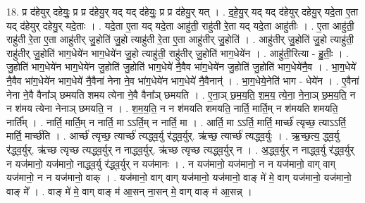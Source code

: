 \documentclass[17pt]{extarticle}
\begin{document}
18. प्र द॑हेयुर् दहेयुः॒ प्र प्र द॑हेयु॒र् यद् यद् द॑हेयुः॒ प्र प्र द॑हेयु॒र् यत् । . द॒हे॒यु॒र् यद् यद् द॑हेयुर् दहेयु॒र् यदे॒ता ए॒ता यद् द॑हेयुर् दहेयु॒र् यदे॒ताः । . यदे॒ता ए॒ता यद् यदे॒ता आहु॑ती॒ राहु॑ती रे॒ता यद् यदे॒ता आहु॑तीः । . ए॒ता आहु॑ती॒ राहु॑ती रे॒ता ए॒ता आहु॑तीर् जु॒होति॑ जु॒हो त्याहु॑ती रे॒ता ए॒ता आहु॑तीर् जु॒होति॑ । . आहु॑तीर् जु॒होति॑ जु॒हो त्याहु॑ती॒ राहु॑तीर् जु॒होति॑ भाग॒धेये॑न भाग॒धेये॑न जु॒हो त्याहु॑ती॒ राहु॑तीर् जु॒होति॑ भाग॒धेये॑न । . आहु॑ती॒रित्या - हु॒तीः॒ । . जु॒होति॑ भाग॒धेये॑न भाग॒धेये॑न जु॒होति॑ जु॒होति॑ भाग॒धेये॑ नै॒वैव भा॑ग॒धेये॑न जु॒होति॑ जु॒होति॑ भाग॒धेये॑नै॒व । . भा॒ग॒धेये॑ नै॒वैव भा॑ग॒धेये॑न भाग॒धेये॑ नै॒वैना॑ नेना ने॒व भा॑ग॒धेये॑न भाग॒धेये॑
नै॒वैनान्॑ । . भा॒ग॒धेये॒नेति॑ भाग - धेये॑न । . ए॒वैना॑ नेना ने॒वै वैना᳚ञ् छमयति शमय त्येना ने॒वै वैना᳚ञ् छमयति । . ए॒ना॒ञ् छ॒म॒य॒ति॒ श॒म॒य॒ त्ये॒ना॒ ने॒ना॒ञ् छ॒म॒य॒ति॒ न न श॑मय त्येना नेनाञ् छमयति॒ न । . श॒म॒य॒ति॒ न न श॑मयति शमयति॒ नार्ति॒ मार्ति॒म् न श॑मयति शमयति॒ नार्ति᳚म् । . नार्ति॒ मार्ति॒म् न नार्ति॒ मा ऽऽर्ति॒म् न नार्ति॒ मा । . आर्ति॒ मा ऽऽर्ति॒ मार्ति॒ मार्च्छ॑ त्यृच्छ॒ त्याऽऽर्ति॒ मार्ति॒ मार्च्छ॑ति । . आर्च्छ॑ त्यृच्छ॒ त्यार्च्छ॑ त्यद्ध्व॒र्यु र॑द्ध्व॒र्युर्. ऋ॑च्छ॒ त्यार्च्छ॑ त्यद्ध्व॒र्युः । . ऋ॒च्छ॒त्य॒ द्ध्व॒र्यु र॑द्ध्व॒र्युर्. ऋ॑च्छ त्यृच्छ त्यद्ध्व॒र्युर् न नाद्ध्व॒र्युर्. ऋ॑च्छ त्यृच्छ त्यद्ध्व॒र्युर् न । . अ॒द्ध्व॒र्युर् न नाद्ध्व॒र्यु र॑द्ध्व॒र्युर् न यज॑मानो॒ यज॑मानो॒ नाद्ध्व॒र्यु र॑द्ध्व॒र्युर् न यज॑मानः । . न यज॑मानो॒ यज॑मानो॒ न न यज॑मानो॒ वाग् वाग् यज॑मानो॒ न न यज॑मानो॒ वाक् । . यज॑मानो॒ वाग् वाग् यज॑मानो॒ यज॑मानो॒ वाङ् मे॑ मे॒ वाग् यज॑मानो॒ यज॑मानो॒ वाङ् मे᳚ । . वाङ् मे॑ मे॒ वाग् वाङ् म॑ आ॒सन् ना॒सन् मे॒ वाग् वाङ् म॑ आ॒सन्न् । \newline
\end{document}
